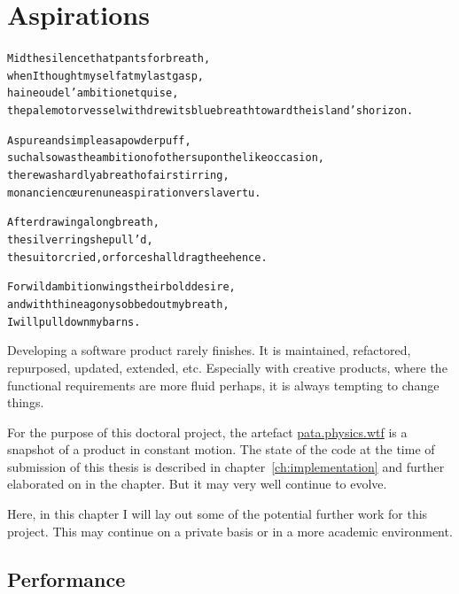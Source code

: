 
\chapter{Aspirations}
\label{ch:future}

\startcontents[chapters]

\vfill

\begin{alltt}\sffamily
Mid the silence that pants for breath,
when I thought myself at my last gasp,
haine ou de l'ambition et qui se,
the pale motor vessel withdrew its blue breath toward the island's horizon.

As pure and simple as a powder puff,
such also was the ambition of others upon the like occasion,
there was hardly a breath of air stirring,
mon ancien cœur en une aspiration vers la vertu.

After drawing a long breath,
the silver ring she pull'd,
the suitor cried, or force shall drag thee hence.

For wild ambition wings their bold desire,
and with thine agony sobbed out my breath,
I will pull down my barns.
\end{alltt}

\newpage
\minicontents
\spirals


Developing a software product rarely finishes. It is maintained, refactored, repurposed, updated, extended, etc. Especially with creative products, where the functional requirements are more fluid perhaps, it is always tempting to change things. 

For the purpose of this doctoral project, the artefact \url{pata.physics.wtf} is a snapshot of a product in constant motion. The state of the code at the time of submission of this thesis is described in chapter~\ref{ch:implementation} and further elaborated on in the  chapter. But it may very well continue to evolve.

Here, in this chapter I will lay out some of the potential further work for this project. This may continue on a private basis or in a more academic environment. 


\section{Performance}
\label{s:performance}

